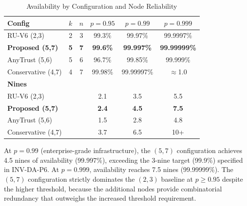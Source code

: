 \begin{table}[t]
\centering
\caption{Availability by Configuration and Node Reliability}
\label{tab:availability-configs}
\begin{tabular}{@{}lccccc@{}}
\toprule
\textbf{Config} & $k$ & $n$ & $p{=}0.95$ & $p{=}0.99$ & $p{=}0.999$ \\
\midrule
RU-V6 (2,3)     & 2 & 3 & 99.3\%  & 99.97\%   & 99.9997\% \\
\textbf{Proposed (5,7)} & \textbf{5} & \textbf{7} & \textbf{99.6\%} & \textbf{99.997\%} & \textbf{99.99999\%} \\
AnyTrust (5,6)  & 5 & 6 & 96.7\%  & 99.85\%   & 99.999\%  \\
Conservative (4,7) & 4 & 7 & 99.98\% & 99.99997\% & $\approx$1.0 \\
\midrule
\textbf{Nines} & & & & & \\
RU-V6 (2,3)     & & & 2.1 & 3.5 & 5.5 \\
\textbf{Proposed (5,7)} & & & \textbf{2.4} & \textbf{4.5} & \textbf{7.5} \\
AnyTrust (5,6)  & & & 1.5 & 2.8 & 4.8 \\
Conservative (4,7) & & & 3.7 & 6.5 & 10+ \\
\bottomrule
\end{tabular}
\end{table}

At $p = 0.99$ (enterprise-grade infrastructure), the $(5,7)$
configuration achieves 4.5 nines of availability (99.997\%), exceeding
the 3-nine target (99.9\%) specified in INV-DA-P6. At $p = 0.999$,
availability reaches 7.5 nines (99.99999\%). The $(5,7)$ configuration
strictly dominates the $(2,3)$ baseline at $p \geq 0.95$ despite the
higher threshold, because the additional nodes provide combinatorial
redundancy that outweighs the increased threshold requirement.

